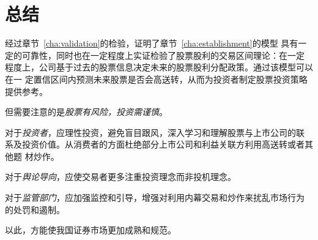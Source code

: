 \documentclass[../main]{subfiles}
\begin{document}
\chapter{总结}%
\label{cha:conclusion}

经过章节~\ref{cha:validation}的检验，证明了章节~\ref{cha:establishment}的模型
具有一定的可靠性，同时也在一定程度上实证检验了股票股利的交易区间理论：在一定
程度上，公司基于过去的股票信息决定未来的股票股利分配政策。通过该模型可以在一
定置信区间内预测未来股票是否会高送转，从而为投资者制定股票投资策略提供参考。

但需要注意的是\emph{股票有风险，投资需谨慎}。

对于\emph{投资者}，应理性投资，避免盲目跟风，深入学习和理解股票与上市公司的联
系及投资价值。从消费者的方面杜绝部分上市公司和利益关联方利用高送转或者其他题
材炒作。

对于\emph{舆论导向}，应使交易者更多注重投资理念而非投机理念。

对于\emph{监管部门}，应加强监控和引导，增强对利用内幕交易和炒作来扰乱市场行为
的处罚和遏制。

以此，方能使我国证券市场更加成熟和规范。
\end{document}
